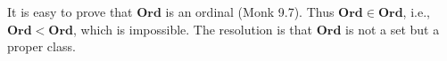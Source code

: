 It is easy to prove that $\mathbf{Ord}$ is an ordinal (Monk 9.7). Thus $\mathbf{Ord} \in \mathbf{Ord}$, i.e., $\mathbf{Ord} < \mathbf{Ord}$, which is impossible. The resolution is that $\mathbf{Ord}$ is not a set but a proper class.
